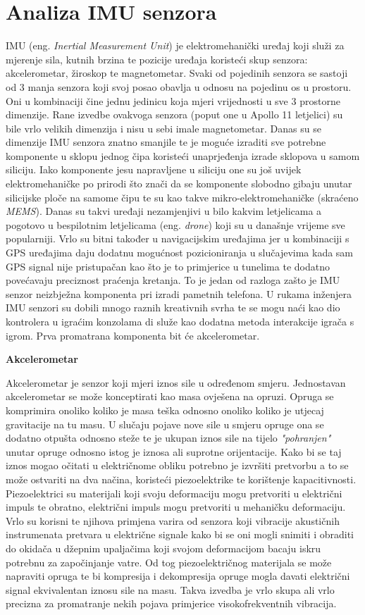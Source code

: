 \documentclass[times, utf8, diplomski]{fer}
\begin{document}
\section{Analiza IMU senzora}
IMU (eng. \textit{Inertial Measurement Unit}) je elektromehanički uređaj koji služi za mjerenje sila, kutnih brzina te pozicije
uređaja koristeći skup senzora: akcelerometar, žiroskop te magnetometar. Svaki od pojedinih senzora se sastoji od 3 manja senzora
koji svoj posao obavlja u odnosu na pojedinu os u prostoru. Oni u kombinaciji čine jednu jedinicu koja mjeri vrijednosti u sve 
3 prostorne dimenzije. Rane izvedbe ovakvoga senzora (poput one u Apollo 11 letjelici) su bile vrlo velikih dimenzija i nisu
u sebi imale magnetometar. Danas su se dimenzije IMU senzora znatno smanjile te je moguće izraditi sve potrebne komponente u
sklopu jednog čipa koristeći unaprjeđenja izrade sklopova u samom siliciju. Iako komponente jesu napravljene u siliciju one su
još uvijek elektromehaničke po prirodi što znači da se komponente slobodno gibaju unutar silicijske ploče na samome čipu
te su kao takve mikro-elektromehaničke (skraćeno \textit{MEMS}). Danas su takvi uređaji nezamjenjivi u bilo kakvim letjelicama a
pogotovo u bespilotnim letjelicama (eng. \textit{drone}) koji su u današnje vrijeme sve popularniji. Vrlo su bitni također u
navigacijskim uređajima jer u kombinaciji s GPS uređajima daju dodatnu mogućnost pozicioniranja u slučajevima kada sam GPS signal
nije pristupačan kao što je to primjerice u tunelima te dodatno povećavaju preciznost praćenja kretanja. To je jedan od razloga
zašto je IMU senzor neizbježna komponenta pri izradi pametnih telefona. U rukama inženjera IMU senzori su dobili mnogo raznih 
kreativnih svrha te se mogu naći kao dio kontrolera u igraćim konzolama di služe kao dodatna metoda interakcije igrača s igrom.
Prva promatrana komponenta bit će akcelerometar.

\textbf{Akcelerometar}

Akcelerometar je senzor koji mjeri iznos sile u određenom smjeru. Jednostavan akcelerometar se može konceptirati kao masa ovješena na 
opruzi. Opruga se komprimira onoliko koliko je masa teška odnosno onoliko koliko je utjecaj gravitacije na tu masu. U slučaju
pojave nove sile u smjeru opruge ona se dodatno otpušta odnosno steže te je ukupan iznos sile na tijelo \textit{"pohranjen"}
unutar opruge odnosno istog je iznosa ali suprotne orijentacije. Kako bi se taj iznos mogao očitati u električnome obliku potrebno
je izvršiti pretvorbu a to se može ostvariti na dva načina, koristeći piezoelektrike te korištenje kapacitivnosti. Piezoelektrici
su materijali koji svoju deformaciju mogu pretvoriti u električni impuls te obratno, električni impuls mogu pretvoriti u mehaničku
deformaciju. Vrlo su korisni te njihova primjena varira od senzora koji vibracije akustičnih instrumenata pretvara u električne
signale kako bi se oni mogli snimiti i obraditi do okidača u džepnim upaljačima koji svojom deformacijom bacaju iskru potrebnu za
započinjanje vatre. Od tog piezoelektričnog materijala se može napraviti opruga te bi kompresija i dekompresija opruge mogla davati
električni signal ekvivalentan iznosu sile na masu. Takva izvedba je vrlo skupa ali vrlo precizna za promatranje nekih pojava 
primjerice visokofrekventnih vibracija.
\end{document}
